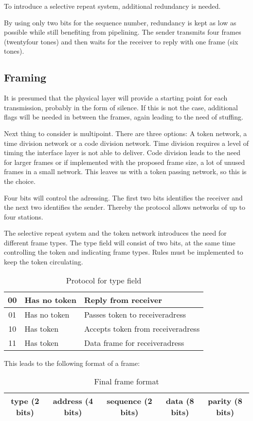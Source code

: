 To introduce a selective repeat system, additional redundancy is needed.

By using only two bits for the sequence number, redundancy is kept as low as
possible while still benefiting from pipelining. The sender transmits four
frames (twentyfour tones) and then waits for the receiver to reply with one frame (six
tones).

\subsection{Framing}
It is presumed that the physical layer will provide a starting point for each
transmission, probably in the form of silence. If this is not the case,
additional flags will be needed in between the frames, again leading to the need
of stuffing.

Next thing to consider is multipoint. There are three options: A token
network, a time division network or a code division network. Time division
requires a level of timing the interface layer is not able to deliver.
Code division leads to the need for larger frames or if implemented with the
proposed frame size, a lot of unused frames in a small network. This leaves us
with a token passing network, so this is the choice.

Four bits will control the adressing. The first two
bits identifies the receiver and the next two identifies the sender. Thereby the
protocol allows networks of up to four stations.

The selective repeat system and the token network introduces the need for different frame types.
The type field will consist of two bits, at the same time controlling
the token and indicating frame types. Rules must be implemented to keep the token circulating.

\begin{table}[htb]
	\begin{center}
	\begin{tabular}{|c|ll|}
		\hline
		00 & Has no token & Reply from receiver \\
		\hline
		01 & Has no token & Passes token to receiveradress \\
		\hline
		10 & Has token & Accepts token from receiveradress \\
		\hline
		11 & Has token & Data frame for receiveradress \\
		\hline
	\end{tabular}
	\end{center}
	\caption{Protocol for type field}
	\label{tab:Protocol_for_type_field}
\end{table}

This leads to the following format of a frame: 

\begin{table}[htb]
	\begin{center}
	\begin{tabular}{|ccc|c|c|}
		\hline
		type (2 bits) & address (4 bits) & sequence (2 bits) & data (8 bits) & parity (8 bits)  \\
		\hline
	\end{tabular}
	\end{center}
	\caption{Final frame format}
	\label{tab:Final_frame_format}
\end{table}
